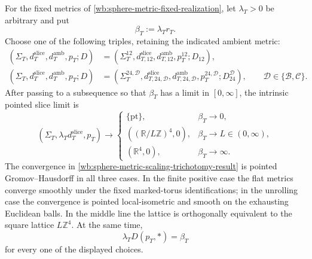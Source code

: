 \begin{theorem}
\label{wb:sphere-metric-scaling-trichotomy}
For the fixed metrics of
\cref{wb:sphere-metric-fixed-realization}, let \(\lambda_T>0\) be arbitrary
and put
\[
 \beta_T:=\lambda_Tr_T.
\]
Choose one of the following triples, retaining the indicated ambient
metric:
\[
 \begin{split}
  (\Sigma_T,d_T^{\mathrm{slice}},d_T^{\mathrm{amb}},p_T;D)
  &=(\Sigma_T^{12},d_{T,12}^{\mathrm{slice}},
      d_{T,12}^{\mathrm{amb}},p_T^{12};D_{12}),\\
  (\Sigma_T,d_T^{\mathrm{slice}},d_T^{\mathrm{amb}},p_T;D)
  &=(\Sigma_T^{24,\mathcal D},
      d_{T,24,\mathcal D}^{\mathrm{slice}},
      d_{T,24,\mathcal D}^{\mathrm{amb}},
      p_T^{24,\mathcal D};D_{24}^{\mathcal D}),
      \qquad \mathcal D\in\{\mathcal B,\mathcal C\}.
 \end{split}
\]
After passing to a subsequence so that \(\beta_T\) has a limit in
\([0,\infty]\), the intrinsic pointed slice limit is
\begin{equation}
 (\Sigma_T,\lambda_Td_T^{\mathrm{slice}},p_T)
 \longrightarrow
 \begin{cases}
  \{\mathrm{pt}\},&\beta_T\longrightarrow0,\\
  ((\mathbb R/L\mathbb Z)^4,0),
      &\beta_T\longrightarrow L\in(0,\infty),\\
  (\mathbb R^4,0),&\beta_T\longrightarrow\infty.
 \end{cases}
 \label{wb:sphere-metric-scaling-trichotomy-result}
\end{equation}
The convergence in
\eqref{wb:sphere-metric-scaling-trichotomy-result} is pointed
Gromov--Hausdorff in all three cases.  In the finite positive case the flat
metrics converge smoothly under the fixed marked-torus identifications; in
the unrolling case the convergence is pointed local-isometric and smooth on
the exhausting Euclidean balls.
In the middle line the lattice is orthogonally equivalent to the square
lattice \(L\mathbb Z^4\).  At the same time,
\begin{equation}
 \lambda_TD(p_T,*)=\beta_T
 \label{wb:sphere-metric-vertex-distance}
\end{equation}
for every one of the displayed choices.


\end{theorem}
